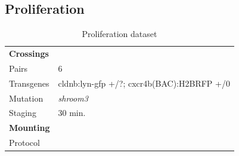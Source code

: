 \documentclass[11pt,singlespacinge,twoside]{reedthesis} %
\begin{document}
\hypertarget{tl-data}{%
\subsection{Proliferation}\label{tl-data}}
\begin{longtable}[]{@{}ll@{}}
\caption{\label{tab:prolifdata} Proliferation dataset}\tabularnewline
\toprule
\endhead
\begin{minipage}[t]{0.21\columnwidth}\raggedright
\textbf{Crossings}\strut
\end{minipage} & \begin{minipage}[t]{0.73\columnwidth}\raggedright
\strut
\end{minipage}\tabularnewline
\begin{minipage}[t]{0.21\columnwidth}\raggedright
Pairs\strut
\end{minipage} & \begin{minipage}[t]{0.73\columnwidth}\raggedright
6\strut
\end{minipage}\tabularnewline
\begin{minipage}[t]{0.21\columnwidth}\raggedright
Transgenes\strut
\end{minipage} & \begin{minipage}[t]{0.73\columnwidth}\raggedright
cldnb:lyn-gfp +/?; cxcr4b(BAC):H2BRFP +/0\strut
\end{minipage}\tabularnewline
\begin{minipage}[t]{0.21\columnwidth}\raggedright
Mutation\strut
\end{minipage} & \begin{minipage}[t]{0.73\columnwidth}\raggedright
\emph{shroom3}\strut
\end{minipage}\tabularnewline
\begin{minipage}[t]{0.21\columnwidth}\raggedright
Staging\strut
\end{minipage} & \begin{minipage}[t]{0.73\columnwidth}\raggedright
30 min.\strut
\end{minipage}\tabularnewline
\begin{minipage}[t]{0.21\columnwidth}\raggedright
\textbf{Mounting}\strut
\end{minipage} & \begin{minipage}[t]{0.73\columnwidth}\raggedright
\strut
\end{minipage}\tabularnewline
\begin{minipage}[t]{0.21\columnwidth}\raggedright
Protocol\strut
\end{minipage} & \begin{minipage}[t]{0.73\columnwidth}\raggedright

\end{minipage}
\end{longtable}
\end{document}
